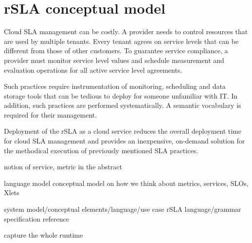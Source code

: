 \section{rSLA conceptual model}

Cloud SLA management can be costly. A provider needs to control resources that are used by multiple tenants. Every tenant agrees on service levels that can be different from those of other customers. To guarantee service compliance, a provider must monitor service level values and schedule measurement and evaluation operations for all active service level agreements. 

Such practices require instrumentation of monitoring, scheduling and data storage tools that can be tedious to deploy for someone unfamiliar with IT. In addition, such practices are performed systematically.  A semantic vocabulary is required for their management.

Deployment of the rSLA as a cloud service reduces the overall deployment time for cloud SLA management and provides an inexpensive, on-demand solution for the methodical execution of previously mentioned SLA practices. 

notion of service, metric in the abstract

language model
conceptual model on how we think about metrics, services, SLOs, Xlets

system model/conceptual elements/language/use case
rSLA language/grammar specification reference 

capture the whole runtime